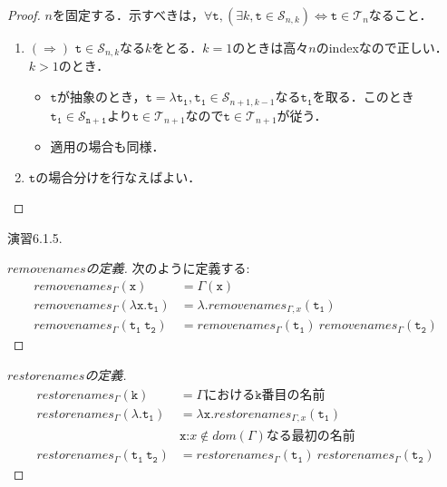 \documentclass[9pt]{beamer}
\begin{document}
\begin{frame}
\begin{proof}
$n$を固定する．示すべきは，$\forall \mathtt{t},(\exists k, \mathtt{t}\in\mathcal{S}_{n, k}) \Leftrightarrow \mathtt{t}\in\mathcal{T}_{n}$なること．\begin{enumerate}
\item $(\Rightarrow)$ $\mathtt{t}\in\mathcal{S}_{n,k}$なる$k$をとる．$k = 1$のときは高々$n$のindexなので正しい．$k > 1$のとき．\begin{itemize}\item$\mathtt{t}$が抽象のとき，$\mathtt{t = \lambda t_{1}},\mathtt{t_{1}}\in\mathcal{S}_{n+ 1, k - 1}$なる$\mathtt{t_{1}}$を取る．このとき$\mathtt{t_{1}\in\mathcal{S}_{n + 1}}$より$\mathtt{t}\in\mathcal{T}_{n + 1}$なので$\mathtt{t}\in\mathcal{T}_{n + 1}$が従う．\item 適用の場合も同様．\end{itemize}
\item $\mathtt{t}$の場合分けを行なえばよい．
\end{enumerate}
\end{proof}
\end{frame}
\begin{frame}{演習6.1.5.}
	\begin{proof}[$removenames$の定義]
	次のように定義する:\begin{align*}
	removenames_{\Gamma}(\mathtt{x}) &= \Gamma(\mathtt{x})\\
	removenames_{\Gamma}(\mathtt{\lambda x. t_{1}})&=\lambda.removenames_{\Gamma,x}(\mathtt{t_{1}})\\
	removenames_{\Gamma}(\mathtt{t_{1}\ t_{2}}) &= removenames_{\Gamma}(\mathtt{t_{1}})\ removenames_{\Gamma}(\mathtt{t_{2}})
	\end{align*}
	\end{proof}
	\begin{proof}[$restorenames$の定義]
	\begin{align*}
	restorenames_{\Gamma}(\mathtt{k}) &= \text{$\Gamma$における$\mathtt{k}$番目の名前}\\
	restorenames_{\Gamma}(\mathtt{\lambda . t_{1}}) &= \mathtt{\lambda x.}restorenames_{\Gamma,x}(\mathtt{t_{1}})\\
		&\text{$\mathtt{x}$:$x\notin dom(\Gamma)$なる最初の名前}\\
	restorenames_{\Gamma}(\mathtt{t_{1}\ t_{2}}) &= 	restorenames_{\Gamma}(\mathtt{t_{1}})\ restorenames_{\Gamma}(\mathtt{t_{2}})
	\end{align*}
	\end{proof}
\end{frame}
\end{document}
